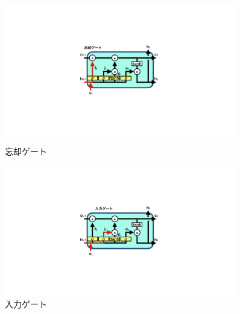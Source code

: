 \begin{figure}[h]
 \centering
  \begin{minipage}{1.0\textwidth}
  \centering
   \begin{minipage}{0.48\textwidth}
    \centering
    \includegraphics[trim = 600 300 600 300, width=0.9\textwidth, clip]{Figure/2DeepLearning/12ForgetGate.png}
    \caption{忘却ゲート}
    \label{12ForgetGate}
   \end{minipage}
   \begin{minipage}{0.48\textwidth}
   \centering
    \includegraphics[trim = 600 300 600 300, width=0.9\textwidth, clip]{Figure/2DeepLearning/13InputGate.png}
    \caption{入力ゲート}
    \label{13InputGate}
   \end{minipage}
  \end{minipage}
  

\end{figure}
